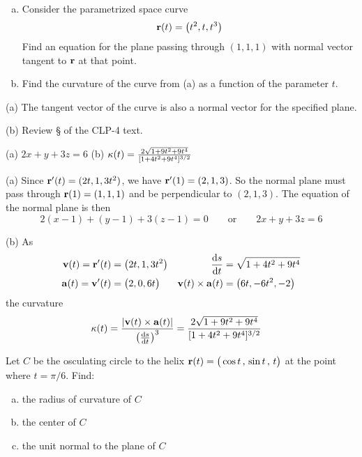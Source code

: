 \begin{question}[M317 2013D] %

\begin{enumerate}[(a)]
\item
Consider the parametrized space curve
\begin{equation*}
\mathbf{r}(t) = \big(t^2 , t, t^3\big)
\end{equation*}
Find an equation for the plane passing through $(1,1,1)$ with normal vector tangent to $\mathbf{r}$ at that point.

\item
Find the curvature of the curve from (a) as a function of the parameter $t$.

\end{enumerate}
\end{question}

\begin{hint} 
(a) The tangent vector of the curve is also a normal vector for the 
specified plane. 

(b) Review \S{} of the CLP-4 text.
\end{hint}

\begin{answer} 
(a) $2x +y +3z= 6$\qquad
(b) $\kappa(t) =\frac{2\sqrt{1+9t^2+9t^4}}{[1+4t^2+9t^4]^{3/2}}$
\end{answer}

\begin{solution} (a) 
Since $\mathbf{r}'(t) = (2t,1,3t^2)$, we have $\mathbf{r}'(1)=(2,1,3)$. So the
normal plane must pass through $\mathbf{r}(1)=(1,1,1)$ and be perpendicular 
to $(2,1,3)$. The equation of the normal plane is then
\begin{equation*}
2(x-1) +(y-1) +3(z-1)=0\qquad
\text{or}\qquad
2x +y +3z= 6
\end{equation*}

\noindent (b)
As
\begin{align*}
\vv(t)=\vr'(t)&=\big(2t,1,3t^2\big) &
\diff{s}{t} &= \sqrt{1+4t^2+9t^4}\\
\va(t)=\vv'(t)&=\big(2,0,6t\big)  &
\vv(t)\times\va(t)&=\big(6t,-6t^2,-2\big)
\end{align*}
the curvature
\begin{align*}
\ka(t) &= \frac{|\vv(t)\times\va(t)|}{\big(\diff{s}{t}\big)^3}
 =\frac{2\sqrt{1+9t^2+9t^4}}{[1+4t^2+9t^4]^{3/2}}
\end{align*}

\end{solution}
\begin{question}[M317 2005A] %
	Let $C$ be the osculating circle to the helix 
	$\mathbf{r}(t) =\big(\cos t\,,\,\sin t\,,\,t\big)$ 
	at the point where $t=\pi/6$. Find:
	\begin{enumerate}[(a)]
		\item
		the radius of curvature of $C$
		\item
		the center of $C$
		\item
		the unit normal to the plane of $C$
	\end{enumerate}
	
	
\end{question}

